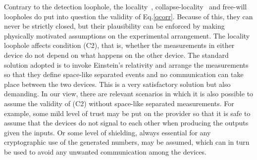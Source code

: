 \documentclass[11pt,a4paper]{article}
\begin{document}
Contrary to the detection loophole, the locality~\cite{aspect}, collapse-locality~\cite{AK} and free-will~\cite{qrngloop} loopholes do put into question the validity of Eq.\eqref{qcorr}. Because of this, they can never be strictly closed, but their plausibility can be enforced by making physically motivated assumptions on the experimental arrangement. The locality loophole affects condition (C2), that is, whether the measurements in either device %
do not depend on what happens on the other device. %
The standard solution adopted is to invoke Einstein's relativity and arrange the measurements so that they define space-like separated events and no communication can take place between the two devices. This is a very satisfactory solution but also demanding.
In our view, there are relevant scenarios in which it is also possible to assume the validity of (C2) without space-like separated measurements. For example, some mild level of trust may be put on the provider so that it is safe to assume that the devices do not signal to each other when producing the outputs given the inputs. Or some level of shielding, always essential for any cryptographic use of the generated numbers, may be assumed, which can in turn be used to avoid any unwanted communication among the devices.
\end{document}
